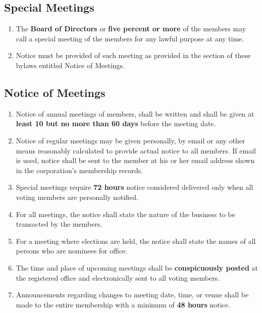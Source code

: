 \documentclass{article}
\begin{document}
\subsection{Special Meetings}
\begin{enumerate}
    \item The \textbf{Board of Directors} or \textbf{five percent or more} of the members may call a special meeting of the members for any lawful purpose at any time.
    \item Notice must be provided of such meeting as provided in the section of these bylaws entitled Notice of Meetings.
\end{enumerate}
\subsection{Notice of Meetings}
\begin{enumerate}
    \item Notice of annual meetings of members, shall be written and shall be
    given at \textbf{least 10 but no more than 60 days} before the meeting date.
    \item Notice of regular meetings may be given personally, by email or any
    other means reasonably calculated to provide actual notice to all members.
    If email is used, notice shall be sent to the member at his or her email
    address shown in the corporation’s membership records.
    \item Special meetings require \textbf{72 hours} notice considered delivered only
    when all voting members are personally notified.
    \item For all meetings, the notice shall state the nature of the business to
    be transacted by the members.
    \item For a meeting where elections are held, the notice shall state the
    names of all persons who are nominees for office.
    \item The time and place of upcoming meetings shall be \textbf{conspicuously posted}
    at the registered office and electronically sent to all voting members.
    \item Announcements regarding changes to meeting date, time, or venue shall
    be made to the entire membership with a minimum of \textbf{48 hours} notice.
\end{enumerate}
\end{document}
